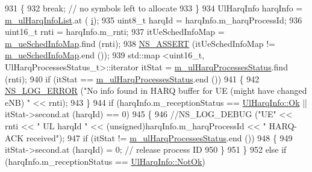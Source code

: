 \begin{DoxyCode}
931                         \{
932                                 \textcolor{keywordflow}{break};  \textcolor{comment}{// no symbols left to allocate}
933                         \}
934                         UlHarqInfo harqInfo = \hyperlink{classns3_1_1MmWaveFlexTtiMaxRateMacScheduler_a686a92955acbcdcde854c36eb9aaf82d}{m\_ulHarqInfoList}.at (
      \hyperlink{bernuolliDistribution_8m_a6f6ccfcf58b31cb6412107d9d5281426}{i});
935                         uint8\_t harqId = harqInfo.m\_harqProcessId;
936                         uint16\_t rnti = harqInfo.m\_rnti;
937                         itUeSchedInfoMap = \hyperlink{classns3_1_1MmWaveFlexTtiMaxRateMacScheduler_ac8359b3799f29f5b49e0f2dd52acd0ab}{m\_ueSchedInfoMap}.find (rnti);
938                         \hyperlink{assert_8h_a6dccdb0de9b252f60088ce281c49d052}{NS\_ASSERT} (itUeSchedInfoMap != \hyperlink{classns3_1_1MmWaveFlexTtiMaxRateMacScheduler_ac8359b3799f29f5b49e0f2dd52acd0ab}{m\_ueSchedInfoMap}.end ());
939                         std::map <uint16\_t, UlHarqProcessesStatus\_t>::iterator itStat = 
      \hyperlink{classns3_1_1MmWaveFlexTtiMaxRateMacScheduler_a4c1a909f08f91a4c845df5310c35f9ff}{m\_ulHarqProcessesStatus}.find (rnti);
940                         \textcolor{keywordflow}{if} (itStat == \hyperlink{classns3_1_1MmWaveFlexTtiMaxRateMacScheduler_a4c1a909f08f91a4c845df5310c35f9ff}{m\_ulHarqProcessesStatus}.end ())
941                         \{
942                                 \hyperlink{group__logging_ga0261a8db1d4ac5f79417d117634fd455}{NS\_LOG\_ERROR} (\textcolor{stringliteral}{"No info found in HARQ buffer for UE (might have
       changed eNB) "} << rnti);
943                         \}
944                         \textcolor{keywordflow}{if} (harqInfo.m\_receptionStatus == \hyperlink{structns3_1_1UlHarqInfo_af1ea9a1ce02c9b4a551ac978484a4336ad61a738c75abe251c05daa2461ecf308}{UlHarqInfo::Ok} || itStat->second.at
       (harqId) == 0)
945                         \{
946                                 \textcolor{comment}{//NS\_LOG\_DEBUG ("UE" << rnti << " UL harqId " <<
       (unsigned)harqInfo.m\_harqProcessId << " HARQ-ACK received");}
947                                 \textcolor{keywordflow}{if} (itStat != \hyperlink{classns3_1_1MmWaveFlexTtiMaxRateMacScheduler_a4c1a909f08f91a4c845df5310c35f9ff}{m\_ulHarqProcessesStatus}.end ())
948                                 \{
949                                         itStat->second.at (harqId) = 0;  \textcolor{comment}{// release process ID}
950                                 \}
951                         \}
952                         \textcolor{keywordflow}{else} \textcolor{keywordflow}{if} (harqInfo.m\_receptionStatus == \hyperlink{structns3_1_1UlHarqInfo_af1ea9a1ce02c9b4a551ac978484a4336a488db5f30de0c73647fed90c4a994a83}{UlHarqInfo::NotOk})

\end{DoxyCode}
